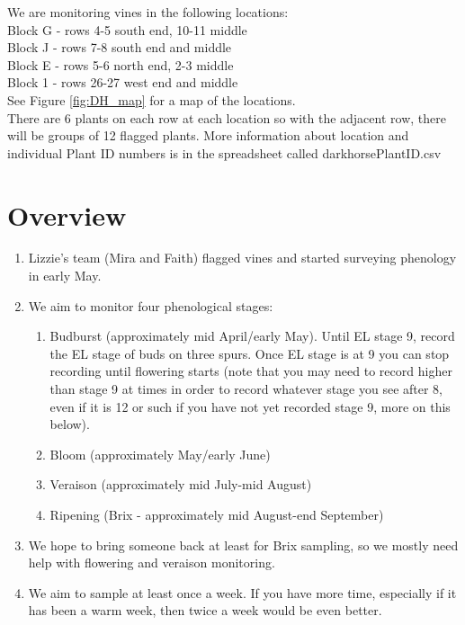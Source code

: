 \documentclass[11pt,letter]{article}
\begin{document}
We are monitoring vines in the following locations: \\
Block G - rows 4-5 south end, 10-11 middle \\
Block J - rows 7-8 south end and middle \\
Block E - rows 5-6 north end, 2-3 middle \\
Block 1 - rows 26-27 west end and middle \\

See Figure \ref{fig:DH_map} for a map of the locations. \\

There are 6 plants on each row at each location so with the adjacent row, there will be groups of 12 flagged plants. More information about location and individual Plant ID numbers is in the spreadsheet called darkhorsePlantID.csv

\section{Overview}
\begin{enumerate}
  \item Lizzie's team (Mira and Faith) flagged vines and started surveying phenology in early May. %
  \item We aim to monitor four phenological stages:
  \begin{enumerate}
	\item Budburst (approximately mid April/early May). Until EL stage 9, record the EL stage of buds on three spurs. Once EL stage is at 9 you can stop recording until flowering starts (note that you may need to record higher than stage 9 at times in order to record whatever stage you see after 8, even if it is 12 or such if you have not yet recorded stage 9, more on this below).
	\item Bloom (approximately May/early June)
  	\item Veraison (approximately mid July-mid August)
  	\item Ripening (Brix - approximately mid August-end September)
  \end{enumerate}
  \item We hope to bring someone back at least for Brix sampling, so we mostly need help with flowering and veraison monitoring. 
  \item We aim to sample at least once a week. If you have more time, especially if it has been a warm week, then twice a week would be even better.

\end{enumerate}
\end{document}
